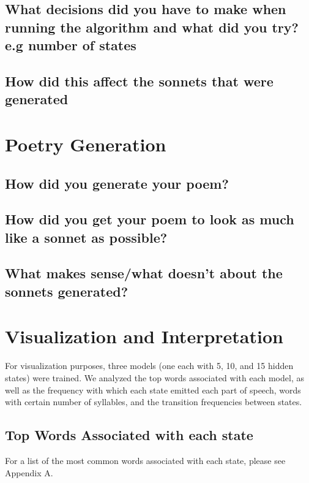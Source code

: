 \subsection{What decisions did you have to make when running the algorithm and what did you try? e.g number of states}
\subsection{How did this affect the sonnets that were generated}

\section{Poetry Generation}
\medskip

\subsection{How did you generate your poem?}
\subsection{How did you get your poem to look as much like a sonnet as possible?}
\subsection{What makes sense/what doesn't about the sonnets generated?}


\section{Visualization and Interpretation}
For visualization purposes, three models (one each with 5, 10, and 15 hidden states) were trained. We analyzed the top words associated with each model, as well as the frequency with which each state emitted each part of speech, words with certain number of syllables, and the transition frequencies between states.

\medskip

\subsection{Top Words Associated with each state}
For a list of the most common words associated with each state, please see Appendix A.\\


